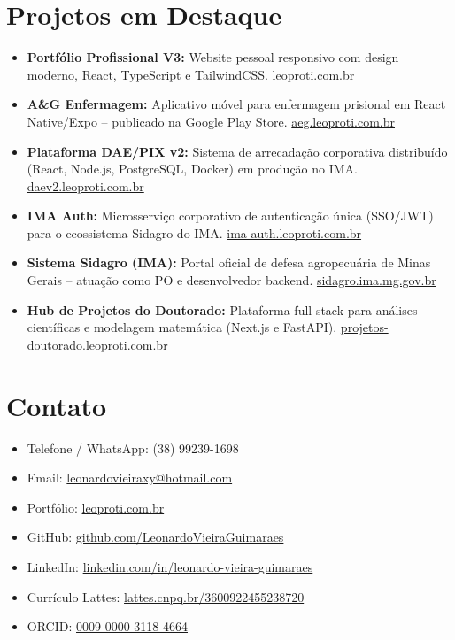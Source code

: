 \documentclass[a4paper,10pt]{article}
\begin{document}
\section*{Projetos em Destaque}
\begin{itemize}[leftmargin=*]
    \item \textbf{Portfólio Profissional V3:} Website pessoal responsivo com design moderno, React, TypeScript e TailwindCSS. \href{https://leoproti.com.br}{leoproti.com.br}
    \item \textbf{A\&G Enfermagem:} Aplicativo móvel para enfermagem prisional em React Native/Expo -- publicado na Google Play Store. \href{https://aeg.leoproti.com.br}{aeg.leoproti.com.br}
    \item \textbf{Plataforma DAE/PIX v2:} Sistema de arrecadação corporativa distribuído (React, Node.js, PostgreSQL, Docker) em produção no IMA. \href{https://daev2.leoproti.com.br}{daev2.leoproti.com.br}
    \item \textbf{IMA Auth:} Microsserviço corporativo de autenticação única (SSO/JWT) para o ecossistema Sidagro do IMA. \href{https://ima-auth.leoproti.com.br}{ima-auth.leoproti.com.br}
    \item \textbf{Sistema Sidagro (IMA):} Portal oficial de defesa agropecuária de Minas Gerais -- atuação como PO e desenvolvedor backend. \href{https://www.sidagro.ima.mg.gov.br/sidagro/login.seam}{sidagro.ima.mg.gov.br}
    \item \textbf{Hub de Projetos do Doutorado:} Plataforma full stack para análises científicas e modelagem matemática (Next.js e FastAPI). \href{https://projetos-doutorado.leoproti.com.br}{projetos-doutorado.leoproti.com.br}
\end{itemize}

\section*{Contato}
\begin{itemize}[leftmargin=*]
    \item Telefone / WhatsApp: (38) 99239-1698
    \item Email: \href{mailto:leonardovieiraxy@hotmail.com}{leonardovieiraxy@hotmail.com}
    \item Portfólio: \href{https://leoproti.com.br}{leoproti.com.br}
    \item GitHub: \href{https://github.com/LeonardoVieiraGuimaraes}{github.com/LeonardoVieiraGuimaraes}
    \item LinkedIn: \href{https://www.linkedin.com/in/leonardo-vieira-guimaraes/}{linkedin.com/in/leonardo-vieira-guimaraes}
    \item Currículo Lattes: \href{http://lattes.cnpq.br/3600922455238720}{lattes.cnpq.br/3600922455238720}
    \item ORCID: \href{https://orcid.org/0009-0000-3118-4664}{0009-0000-3118-4664}
\end{itemize}
\end{document}
